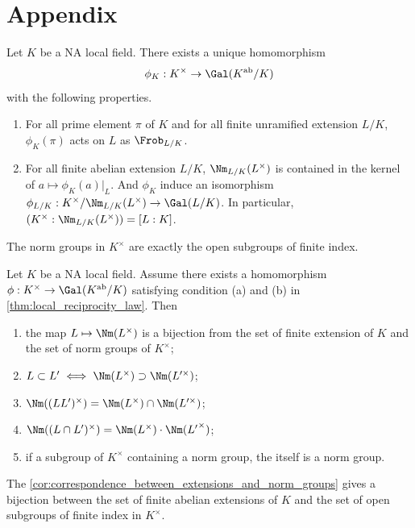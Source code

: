 \section{Appendix}

  \begin{theorem}\label{thm:local_reciprocity_law}
      Let $K$ be a NA local field.
      There exists a unique homomorphism
      \[ \phi_K : K^\times \to \Gal(K^\ab/ K) \]
      with the following properties.
      \begin{enumerate}
          \item For all prime element $\pi$ of $K$ and for all finite unramified extension $L/K$, $\phi_K(\pi)$ acts on $L$ as $\Frob_{L/K}$.
          \item For all finite abelian extension $L/K$, $\Nm_{L/K}(L^\times)$ is contained in the kernel of $a \mapsto \phi_K(a)|_L$.
          And $\phi_K$ induce an isomorphism $\phi_{L/K}: K^\times/\Nm_{L/K}(L^\times) \to \Gal(L/K)$.
          In particular, $(K^\times : \Nm_{L/K}(L^\times)) = [L:K]$.
      \end{enumerate}
  \end{theorem}

  \begin{theorem}\label{thm:norm_groups_are_exactly_open_subgroups_of_finite_index}
    The norm groups in $K^\times$ are exactly the open subgroups of finite index.
  \end{theorem}

    \begin{corollary}\label{cor:correspondence_between_extensions_and_norm_groups}
      Let $K$ be a NA local field.
      Assume there exists a homomorphism $\phi: K^\times \to \Gal(K^\ab / K)$ satisfying condition (a) and (b) in \cref{thm:local_reciprocity_law}.
      Then
      \begin{enumerate}
          \item the map $L \mapsto \Nm(L^\times)$ is a bijection from the set of finite extension of $K$ and the set of norm groups of $K^\times$;
          \item $L \subset L' \iff \Nm(L^\times) \supset \Nm(L'^\times)$;
          \item $\Nm((LL')^\times) = \Nm(L^\times) \cap \Nm(L'^\times)$;
          \item $\Nm((L \cap L')^\times) = \Nm (L^\times) \cdot \Nm ({L'}^\times)$;
          \item if a subgroup of $K^\times$ containing a norm group, the itself is a norm group.
      \end{enumerate}
  \end{corollary}

  \begin{corollary}\label{cor:correspondence_between_extensions_and_open_subgroups}
    The \cref{cor:correspondence_between_extensions_and_norm_groups} gives a bijection between the set of finite abelian extensions of $K$ and the set of open subgroups of finite index in $K^\times$.
  \end{corollary}
